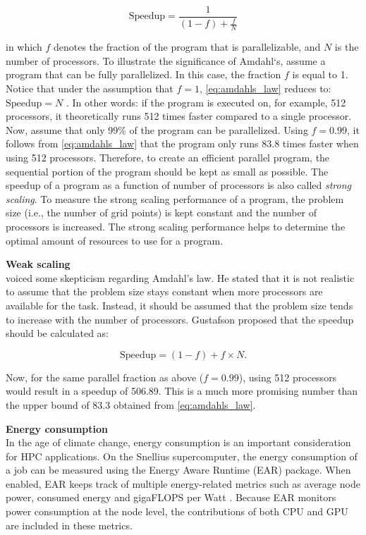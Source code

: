 \begin{equation}
    \text{Speedup} = \frac{1}{(1-f) + \displaystyle \frac{f}{N}}
    \label{eq:amdahls_law}
\end{equation}

\noindent in which $f$ denotes the fraction of the program that is parallelizable, and $N$ is the number of processors. To illustrate the significance of Amdahl`s, assume a program that can be fully parallelized. In this case, the fraction $f$ is equal to 1. Notice that under the assumption that $f=1$, \autoref{eq:amdahls_law} reduces to: $\text{Speedup} = N$ . In other words: if the program is executed on, for example, 512 processors, it theoretically runs 512 times faster compared to a single processor. Now, assume that only 99\% of the program can be parallelized. Using $f=0.99$, it follows from \autoref{eq:amdahls_law} that the program only runs 83.8 times faster when using 512 processors. Therefore, to create an efficient parallel program, the sequential portion of the program should be kept as small as possible. The speedup of a program as a function of number of processors is also called \emph{strong scaling}. To measure the strong scaling performance of a program, the problem size (i.e., the number of grid points) is kept constant and the number of processors is increased. The strong scaling performance helps to determine the optimal amount of resources to use for a program.

\medskip

\noindent \textbf{Weak scaling} \\
\cite{gustafsonReevaluatingAmdahlLaw1988} voiced some skepticism regarding Amdahl's law. He stated that it is not realistic to assume that the problem size stays constant when more processors are available for the task. Instead, it should be assumed that the problem size tends to increase with the number of processors. Gustafson proposed that the speedup should be calculated as:

\begin{equation}
    \text{Speedup} = (1-f) + f \times N.
    \label{eq:gustafsons_law}
\end{equation}

\noindent Now, for the same parallel fraction as above ($f=0.99$), using 512 processors would result in a speedup of 506.89. This is a much more promising number than the upper bound of 83.3 obtained from \autoref{eq:amdahls_law}. 

\medskip

\noindent \textbf{Energy consumption} \\
In the age of climate change, energy consumption is an important consideration for HPC applications.  On the Snellius supercomputer, the energy consumption of a job can be measured using the Energy Aware Runtime (EAR) package. When enabled, EAR keeps track of multiple energy-related metrics such as average node power, consumed energy and gigaFLOPS per Watt \citep{corbalanEnergyOptimizationAnalysis2020}. Because EAR monitors power consumption at the node level, the contributions of both CPU and GPU are included in these metrics.